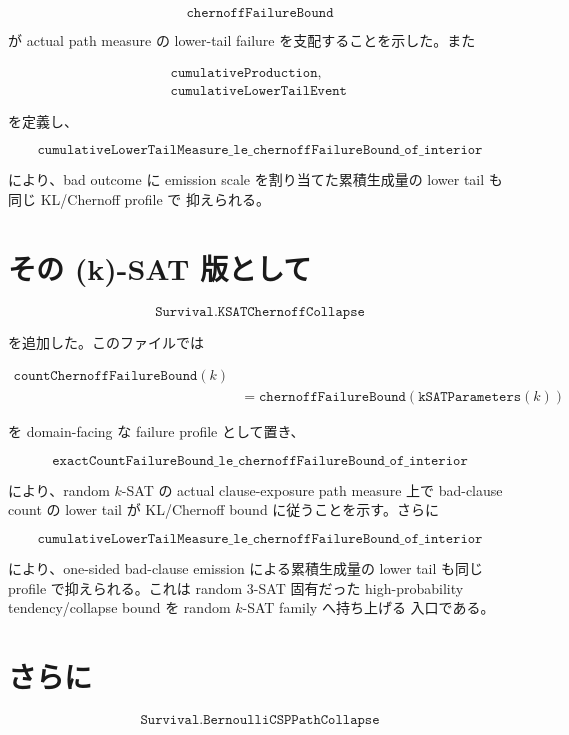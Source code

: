 \documentclass[12pt,a4paper]{article}
\begin{document}
\[
\texttt{chernoffFailureBound}
\]

が actual path measure の lower-tail failure を支配することを示した。また

\[
\begin{aligned}
\texttt{cumulativeProduction},\qquad \\
\texttt{cumulativeLowerTailEvent}
\end{aligned}
\]

を定義し、

\[
\texttt{cumulativeLowerTailMeasure\_le\_chernoffFailureBound\_of\_interior}
\]

により、bad outcome に emission scale を割り当てた累積生成量の lower tail も同じ KL/Chernoff profile で 抑えられる。

\section{その (k)-SAT 版として}\label{ux305dux306e-k-sat-ux7248ux3068ux3057ux3066}

\[
\texttt{Survival.KSATChernoffCollapse}
\]

を追加した。このファイルでは

\[
\begin{aligned}
\texttt{countChernoffFailureBound}(k) \\
&= \texttt{chernoffFailureBound}(\texttt{kSATParameters}(k))
\end{aligned}
\]

を domain-facing な failure profile として置き、

\[
\texttt{exactCountFailureBound\_le\_chernoffFailureBound\_of\_interior}
\]

により、random \(k\)-SAT の actual clause-exposure path measure 上で bad-clause count の lower tail が KL/Chernoff bound に従うことを示す。さらに

\[
\texttt{cumulativeLowerTailMeasure\_le\_chernoffFailureBound\_of\_interior}
\]

により、one-sided bad-clause emission による累積生成量の lower tail も同じ profile で抑えられる。これは random 3-SAT 固有だった high-probability tendency/collapse bound を random \(k\)-SAT family へ持ち上げる 入口である。

\section{さらに}\label{ux3055ux3089ux306b-33}

\[
\texttt{Survival.BernoulliCSPPathCollapse}
\]
\end{document}
